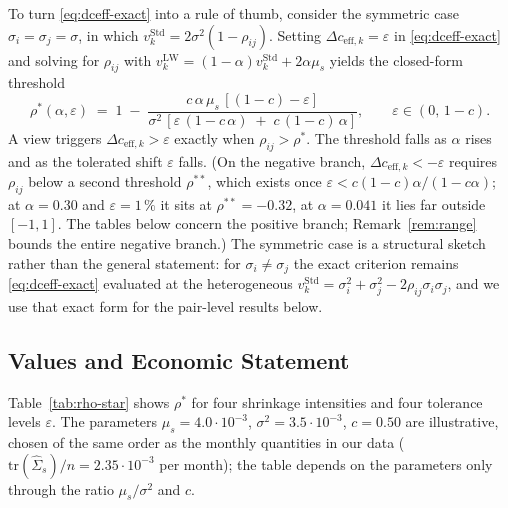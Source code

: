 \documentclass[a4paper,11pt]{article}
\theoremstyle{plain}
\theoremstyle{definition}
\newcommand{\Std}{\mathrm{Std}}
\newcommand{\LW}{\mathrm{LW}}
\newcommand{\eff}{\mathrm{eff}}
\begin{document}
To turn \eqref{eq:dceff-exact} into a rule of thumb, consider the
symmetric case $\sigma_i = \sigma_j = \sigma$, in which
$v_k^\Std = 2\sigma^2(1 - \rho_{ij})$. Setting
$\Delta c_{\eff,k} = \varepsilon$ in \eqref{eq:dceff-exact} and solving
for $\rho_{ij}$ with $v_k^\LW = (1-\alpha)v_k^\Std + 2\alpha\mu_s$
yields the closed-form threshold
\begin{equation}
\label{eq:rho-star}
  \rho^*(\alpha,\varepsilon)
  \;=\;
  1 \;-\; \frac{c\,\alpha\,\mu_s\,[(1-c) - \varepsilon]}
              {\sigma^2\,[\varepsilon\,(1 - c\,\alpha) \;+\; c\,(1-c)\,\alpha]},
  \qquad \varepsilon \in (0,\,1-c).
\end{equation}
A view triggers $\Delta c_{\eff,k} > \varepsilon$ exactly when
$\rho_{ij} > \rho^*$. The threshold falls as $\alpha$ rises and as the
tolerated shift $\varepsilon$ falls. (On the negative branch,
$\Delta c_{\eff,k} < -\varepsilon$ requires $\rho_{ij}$ below a second
threshold $\rho^{**}$, which exists once
$\varepsilon < c(1-c)\alpha/(1-c\alpha)$; at $\alpha = 0.30$ and
$\varepsilon = 1\,\%$ it sits at $\rho^{**} = -0.32$, at
$\alpha = 0.041$ it lies far outside $[-1,1]$. The tables below concern
the positive branch; Remark~\ref{rem:range} bounds the entire negative
branch.) The symmetric case is a structural
sketch rather than the general statement: for $\sigma_i \neq \sigma_j$
the exact criterion remains \eqref{eq:dceff-exact} evaluated at the
heterogeneous $v_k^\Std = \sigma_i^2 + \sigma_j^2 -
2\rho_{ij}\sigma_i\sigma_j$, and we use that exact form for the
pair-level results below.

\subsection{Values and Economic Statement}
\label{sec:values}

Table~\ref{tab:rho-star} shows $\rho^*$ for four shrinkage intensities
and four tolerance levels $\varepsilon$. The parameters $\mu_s = 4.0\cdot
10^{-3}$, $\sigma^2 = 3.5\cdot 10^{-3}$, $c = 0.50$ are illustrative,
chosen of the same order as the monthly quantities in our data
($\mathrm{tr}(\hat\Sigma_s)/n = 2.35\cdot 10^{-3}$ per month); the table
depends on the parameters only through the ratio $\mu_s/\sigma^2$
and $c$.
\end{document}
